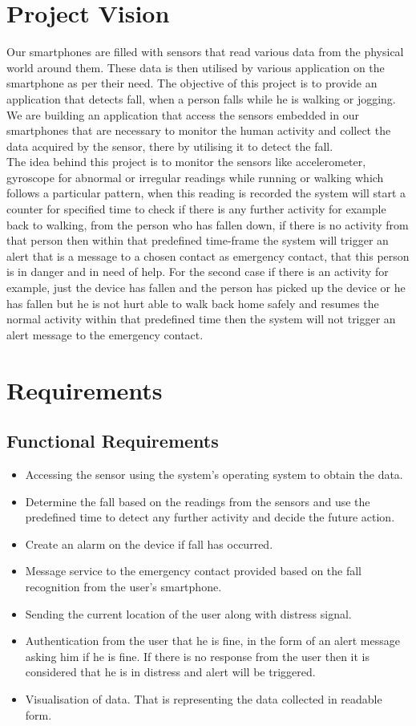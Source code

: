 \documentclass[conference]{IEEEtran}
\begin{document}
\section{Project Vision}
Our smartphones are filled with sensors that read various data from the physical world around them. These data is then utilised by various application on the smartphone as per their need. The objective of this project is to provide an application that detects fall, when a person falls while he is walking or jogging.\\
We are building an application that access the sensors embedded in our smartphones that are necessary to monitor the human activity and collect the data acquired by the sensor, there by utilising it to detect the fall. \\
The idea behind this project is to monitor the sensors like accelerometer, gyroscope for abnormal or irregular readings while running or walking which follows a particular pattern, when this reading is recorded the system will start a counter for specified time to check if there is any further activity for example back to walking, from the person who has fallen down, if there is no activity from that person then within that predefined time-frame the system will trigger an alert that is a message to a chosen contact as emergency contact, that this person is in danger and in need of help. For the second case if there is an activity for example, just the device has fallen and the person has picked up the device or he has fallen but he is not hurt able to walk back home safely and resumes the normal activity within that predefined time then the system will not trigger an alert message to the emergency contact. 

\section{Requirements}
\subsection{Functional Requirements}
\begin{itemize}
\item Accessing the sensor using the system's operating system to obtain the data.
\item Determine the fall based on the readings from the sensors and use the predefined time to detect any further activity and decide the future action.
\item Create an alarm on the device if fall has occurred.
\item Message service to the emergency contact provided based on the fall recognition from the user's smartphone.
\item Sending the current location of the user along with distress signal.
\item Authentication from the user that he is fine, in the form of an alert message asking him if he is fine. If there is no response from the user then it is considered that he is in distress and alert will be triggered.
\item Visualisation of data. That is representing the data collected in readable form.
\end{itemize}
\end{document}
